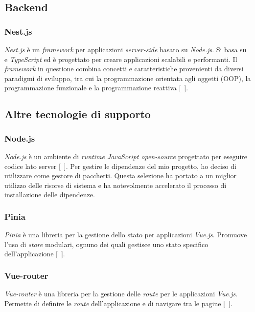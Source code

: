 \subsection{Backend}\label{subsec:backend}
\subsubsection{Nest.js}\label{subsubsec:nest}
\textit{Nest.js} è un \textit{framework} per applicazioni \textit{server-side} basato su \textit{Node.js}. Si basa su  e \textit{TypeScript} ed è progettato per creare applicazioni scalabili e performanti.
Il \textit{framework} in questione combina concetti e caratteristiche provenienti da diversi paradigmi di sviluppo, tra cui la programmazione orientata agli oggetti (OOP), la programmazione funzionale e la programmazione reattiva [~\cite{site:nest.js}].

\subsection{Altre tecnologie di supporto}\label{subsec:altre-tecnologie-di-supporto}
\subsubsection{Node.js}\label{subsubsec:node.js}
\textit{Node.js} è un ambiente di \textit{runtime JavaScript open-source} progettato per eseguire codice lato server [~\cite{site:node}]. Per gestire le dipendenze del mio progetto,
ho deciso di utilizzare  come gestore di pacchetti. Questa selezione ha portato a un miglior utilizzo delle risorse di sistema e ha notevolmente accelerato il processo di 
installazione delle dipendenze.
 \subsubsection{Pinia}\label{subsubsec:pinia}
 \textit{Pinia} è una libreria per la gestione dello stato per applicazioni \textit{Vue.js}. Promuove l'uso di \textit{store} modulari, ognuno dei quali gestisce uno stato specifico dell'applicazione [~\cite{site:pinia}].
\subsubsection{Vue-router}\label{subsubsec:vue-router}
\textit{Vue-router} è una libreria per la gestione delle \textit{route} per le applicazioni \textit{Vue.js}. Permette di definire le \textit{route} dell'applicazione e di navigare tra le pagine [~\cite{site:vue-router}].

